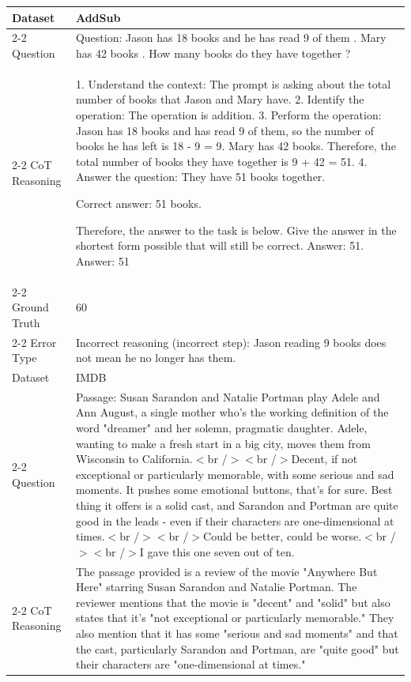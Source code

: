 \begin{table}[h!]
\caption{Error analysis examples for each error type in the AddSub and IMDB datasets.}
\end{table}
\begingroup
\setlength\tabcolsep{2pt}
\small


\setlength\LTleft{0pt}            %
\setlength\LTright{0pt}           %

\vskip -0.35in
\begin{longtable} {p{3cm}p{13.85cm}}
\label{appendix:error-analysis-examples}
\\
\toprule

Dataset & AddSub \\ \cline{2-2}
Question & Question: Jason has 18 books and he has read 9 of them . Mary has 42 books . How many books do they have together ? \\ \cline{2-2}
CoT Reasoning & 1. Understand the context: The prompt is asking about the total number of books that Jason and Mary have.
2. Identify the operation: The operation is addition.
3. Perform the operation: Jason has 18 books and has read 9 of them, so the number of books he has left is 18 - 9 = 9. Mary has 42 books. Therefore, the total number of books they have together is 9 + 42 = 51.
4. Answer the question: They have 51 books together.

Correct answer: 51 books.

Therefore, the answer to the task is below. Give the answer in the shortest form possible that will still be correct.
Answer: 51.
Answer: 51 \\ \cline{2-2}
Ground Truth & 60 \\ \cline{2-2}
Error Type & Incorrect reasoning (incorrect step): Jason reading 9 books does not mean he no longer has them.\\ 

\midrule

Dataset & IMDB \\ \cline{2-2}
Question & Passage: Susan Sarandon and Natalie Portman play Adele and Ann August, a single mother who's the working definition of the word "dreamer" and her solemn, pragmatic daughter. Adele, wanting to make a fresh start in a big city, moves them from Wisconsin to California.$<$br /$>$$<$br /$>$Decent, if not exceptional or particularly memorable, with some serious and sad moments. It pushes some emotional buttons, that's for sure. Best thing it offers is a solid cast, and Sarandon and Portman are quite good in the leads - even if their characters are one-dimensional at times.$<$br /$>$$<$br /$>$Could be better, could be worse.$<$br /$>$$<$br /$>$I gave this one seven out of ten. \\ \cline{2-2}
CoT Reasoning &  The passage provided is a review of the movie "Anywhere But Here" starring Susan Sarandon and Natalie Portman. The reviewer mentions that the movie is "decent" and "solid" but also states that it's "not exceptional or particularly memorable." They also mention that it has some "serious and sad moments" and that the cast, particularly Sarandon and Portman, are "quite good" but their characters are "one-dimensional at times."


\end{longtable}
